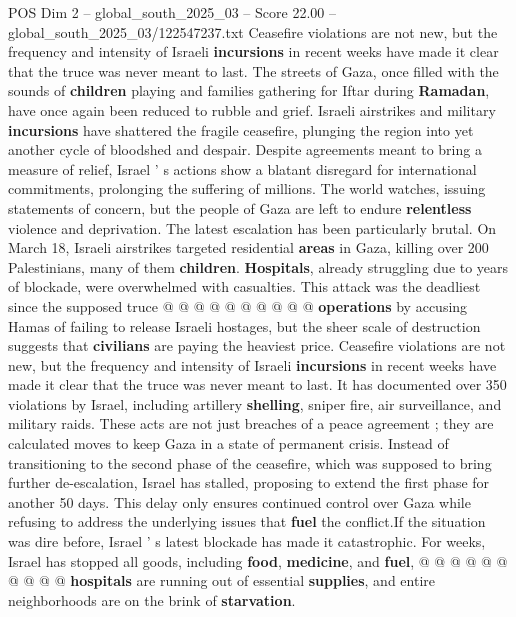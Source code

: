 \begin{textsample}{POS Dim 2 – global\_south\_2025\_03 – Score 22.00 – global\_south\_2025\_03/122547237.txt}  \label{ex:f2_pos_310}
Ceasefire violations are not new, but the frequency and intensity of Israeli \textbf{incursions} in recent weeks have made it clear that the truce was never meant to last.
The streets of Gaza, once filled with the sounds of \textbf{children} playing and families gathering for Iftar during \textbf{Ramadan}, have once again been reduced to rubble and grief.
Israeli airstrikes and military \textbf{incursions} have shattered the fragile ceasefire, plunging the region into yet another cycle of bloodshed and despair.
Despite agreements meant to bring a measure of relief, Israel ' s actions show a blatant disregard for international commitments, prolonging the suffering of millions.
The world watches, issuing statements of concern, but the people of Gaza are left to endure \textbf{relentless} violence and deprivation.
The latest escalation has been particularly brutal.
On March 18, Israeli airstrikes targeted residential \textbf{areas} in Gaza, killing over 200 Palestinians, many of them \textbf{children}. \textbf{Hospitals}, already struggling due to years of blockade, were overwhelmed with casualties.
This attack was the deadliest since the supposed truce @ @ @ @ @ @ @ @ @ @ \textbf{operations} by accusing Hamas of failing to release Israeli hostages, but the sheer scale of destruction suggests that \textbf{civilians} are paying the heaviest price.
Ceasefire violations are not new, but the frequency and intensity of Israeli \textbf{incursions} in recent weeks have made it clear that the truce was never meant to last.
It has documented over 350 violations by Israel, including artillery \textbf{shelling}, sniper fire, air surveillance, and military raids.
These acts are not just breaches of a peace agreement ; they are calculated moves to keep Gaza in a state of permanent crisis.
Instead of transitioning to the second phase of the ceasefire, which was supposed to bring further de-escalation, Israel has stalled, proposing to extend the first phase for another 50 days.
This delay only ensures continued control over Gaza while refusing to address the underlying issues that \textbf{fuel} the conflict.If the situation was dire before, Israel ' s latest blockade has made it catastrophic.
For weeks, Israel has stopped all goods, including \textbf{food}, \textbf{medicine}, and \textbf{fuel}, @ @ @ @ @ @ @ @ @ @ \textbf{hospitals} are running out of essential \textbf{supplies}, and entire neighborhoods are on the brink of \textbf{starvation}.

\end{textsample}
